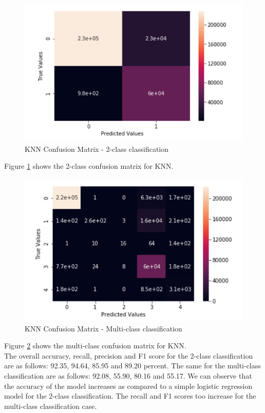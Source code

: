 \begin{figure}
	\includegraphics[width=1.0\columnwidth]{images/knn2.PNG}
	\caption{KNN Confusion Matrix - 2-class classification}
	\label{F:knn2}
\end{figure}
Figure \ref{F:knn2} shows the 2-class confusion matrix for KNN.
\begin{figure}
	\includegraphics[width=1.0\columnwidth]{images/knnall.PNG}
	\caption{KNN Confusion Matrix - Multi-class classification}
	\label{F:knnall}
\end{figure}
Figure \ref{F:knnall} shows the multi-class confusion matrix for KNN.\\
The overall accuracy, recall, precision and F1 score for the 2-class classification are as follows: 92.35, 94.64, 85.95 and 89.20 percent. The same for the multi-class classification are as follows: 92.08, 55.90, 80.16
and 55.17. We can observe that the accuracy of the model increases as compared to a simple logistic regression model for the 2-class classification. The recall and F1 scores too increase for the multi-class classification case.

